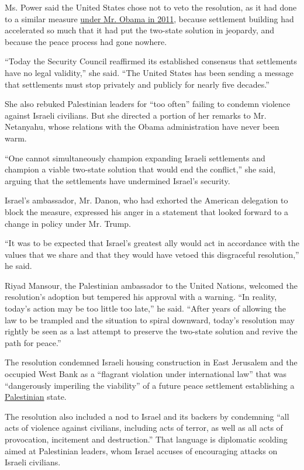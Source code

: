 Ms. Power said the United States chose not to veto the resolution, as it
had done to a similar measure
\href{http://www.nytimes.com/2011/02/19/world/middleeast/19nations.html}{under
Mr. Obama in 2011}, because settlement building had accelerated so much
that it had put the two-state solution in jeopardy, and because the
peace process had gone nowhere.

``Today the Security Council reaffirmed its established consensus that
settlements have no legal validity,'' she said. ``The United States has
been sending a message that settlements must stop privately and publicly
for nearly five decades.''

She also rebuked Palestinian leaders for ``too often'' failing to
condemn violence against Israeli civilians. But she directed a portion
of her remarks to Mr. Netanyahu, whose relations with the Obama
administration have never been warm.

``One cannot simultaneously champion expanding Israeli settlements and
champion a viable two-state solution that would end the conflict,'' she
said, arguing that the settlements have undermined Israel's security.

Israel's ambassador, Mr. Danon, who had exhorted the American delegation
to block the measure, expressed his anger in a statement that looked
forward to a change in policy under Mr. Trump.

``It was to be expected that Israel's greatest ally would act in
accordance with the values that we share and that they would have vetoed
this disgraceful resolution,'' he said.

Riyad Mansour, the Palestinian ambassador to the United Nations,
welcomed the resolution's adoption but tempered his approval with a
warning. ``In reality, today's action may be too little too late,'' he
said. ``After years of allowing the law to be trampled and the situation
to spiral downward, today's resolution may rightly be seen as a last
attempt to preserve the two-state solution and revive the path for
peace.''

The resolution condemned Israeli housing construction in East Jerusalem
and the occupied West Bank as a ``flagrant violation under international
law'' that was ``dangerously imperiling the viability'' of a future
peace settlement establishing a
\href{http://topics.nytimes.com/top/reference/timestopics/subjects/p/palestinians/index.html?inline=nyt-classifier}{Palestinian}
state.

The resolution also included a nod to Israel and its backers by
condemning ``all acts of violence against civilians, including acts of
terror, as well as all acts of provocation, incitement and
destruction.'' That language is diplomatic scolding aimed at Palestinian
leaders, whom Israel accuses of encouraging attacks on Israeli
civilians.

